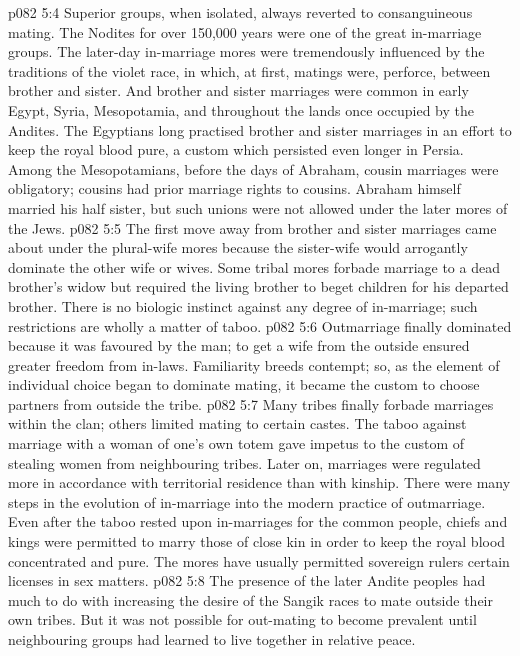 \vs p082 5:4 \pc Superior groups, when isolated, always reverted to consanguineous mating. The Nodites for over 150,000 years were one of the great in\hyp{}marriage groups. The later\hyp{}day in\hyp{}marriage mores were tremendously influenced by the traditions of the violet race, in which, at first, matings were, perforce, between brother and sister. And brother and sister marriages were common in early Egypt, Syria, Mesopotamia, and throughout the lands once occupied by the Andites. The Egyptians long practised brother and sister marriages in an effort to keep the royal blood pure, a custom which persisted even longer in Persia. Among the Mesopotamians, before the days of Abraham, cousin marriages were obligatory; cousins had prior marriage rights to cousins. Abraham himself married his half sister, but such unions were not allowed under the later mores of the Jews.
\vs p082 5:5 The first move away from brother and sister marriages came about under the plural\hyp{}wife mores because the sister\hyp{}wife would arrogantly dominate the other wife or wives. Some tribal mores forbade marriage to a dead brother’s widow but required the living brother to beget children for his departed brother. There is no biologic instinct against any degree of in\hyp{}marriage; such restrictions are wholly a matter of taboo.
\vs p082 5:6 \pc Outmarriage finally dominated because it was favoured by the man; to get a wife from the outside ensured greater freedom from in\hyp{}laws. Familiarity breeds contempt; so, as the element of individual choice began to dominate mating, it became the custom to choose partners from outside the tribe.
\vs p082 5:7 Many tribes finally forbade marriages within the clan; others limited mating to certain castes. The taboo against marriage with a woman of one’s own totem gave impetus to the custom of stealing women from neighbouring tribes. Later on, marriages were regulated more in accordance with territorial residence than with kinship. There were many steps in the evolution of in\hyp{}marriage into the modern practice of outmarriage. Even after the taboo rested upon in\hyp{}marriages for the common people, chiefs and kings were permitted to marry those of close kin in order to keep the royal blood concentrated and pure. The mores have usually permitted sovereign rulers certain licenses in sex matters.
\vs p082 5:8 The presence of the later Andite peoples had much to do with increasing the desire of the Sangik races to mate outside their own tribes. But it was not possible for out\hyp{}mating to become prevalent until neighbouring groups had learned to live together in relative peace.
